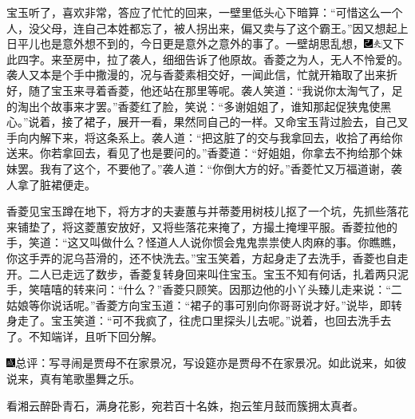 宝玉听了，喜欢非常，答应了忙忙的回来，一壁里低头心下暗算：``可惜这么一个人，没父母，连自己本姓都忘了，被人拐出来，偏又卖与了这个霸王。''因又想起上日平儿也是意外想不到的，今日更是意外之意外的事了。一壁胡思乱想，{\includegraphics[width=3mm]{../Images/00003}\includegraphics[width=3mm]{../Images/00012}\footnotesize \kaishu 又下此四字。}来至房中，拉了袭人，细细告诉了他原故。香菱之为人，无人不怜爱的。袭人又本是个手中撒漫的，况与香菱素相交好，一闻此信，忙就开箱取了出来折好，随了宝玉来寻着香菱，他还站在那里等呢。袭人笑道：``我说你太淘气了，足的淘出个故事来才罢。''香菱红了脸，笑说：``多谢姐姐了，谁知那起促狭鬼使黑心。''说着，接了裙子，展开一看，果然同自己的一样。又命宝玉背过脸去，自己叉手向内解下来，将这条系上。袭人道：``把这脏了的交与我拿回去，收拾了再给你送来。你若拿回去，看见了也是要问的。''香菱道：``好姐姐，你拿去不拘给那个妹妹罢。我有了这个，不要他了。''袭人道：``你倒大方的好。''香菱忙又万福道谢，袭人拿了脏裙便走。

香菱见宝玉蹲在地下，将方才的夫妻蕙与并蒂菱用树枝儿抠了一个坑，先抓些落花来铺垫了，将这菱蕙安放好，又将些落花来掩了，方撮土掩埋平服。香菱拉他的手，笑道：``这又叫做什么？怪道人人说你惯会鬼鬼祟祟使人肉麻的事。你瞧瞧，你这手弄的泥乌苔滑的，还不快洗去。''宝玉笑着，方起身走了去洗手，香菱也自走开。二人已走远了数步，香菱复转身回来叫住宝玉。宝玉不知有何话，扎着两只泥手，笑嘻嘻的转来问：``什么？''香菱只顾笑。因那边他的小丫头臻儿走来说：``二姑娘等你说话呢。''香菱方向宝玉道：``裙子的事可别向你哥哥说才好。''说毕，即转身走了。宝玉笑道：``可不我疯了，往虎口里探头儿去呢。''说着，也回去洗手去了。不知端详，且听下回分解。

{\includegraphics[width=3mm]{../Images/00005}总评：写寻闹是贾母不在家景况，写设筵亦是贾母不在家景况。如此说来，如彼说来，真有笔歌墨舞之乐。}

{看湘云醉卧青石，满身花影，宛若百十名姝，抱云笙月鼓而簇拥太真者。}

